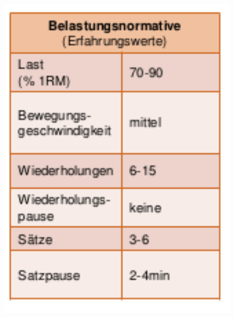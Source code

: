 \begin{minipage}{0.3\textwidth}
\includegraphics[width=0.9\textwidth]{pictures/hypertrophiemethode}
\end{minipage}
